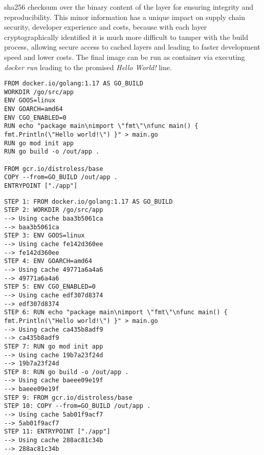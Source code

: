 \documentclass[titlepage]{report}
\begin{document}
\gls{sha256} checksum over the binary content of the layer for ensuring integrity and reproducibility. This minor information
has a unique impact on supply chain security, developer experience and costs, because with each layer cryptographically
identified it is much more difficult to tamper with the build process, allowing secure access to cached layers
and leading to faster development speed and lower costs. The final image can be run as container via executing
\emph{docker run} leading to the promised \emph{Hello World!} line. 
\begin{minipage}{\linewidth}
\begin{lstlisting}[caption={A multi stage Dockerfile with different layers},label={lst:dockerfile}]
FROM docker.io/golang:1.17 AS GO_BUILD
WORKDIR /go/src/app
ENV GOOS=linux
ENV GOARCH=amd64
ENV CGO_ENABLED=0
RUN echo "package main\nimport \"fmt\"\nfunc main() { fmt.Println(\"Hello world!\") }" > main.go
RUN go mod init app
RUN go build -o /out/app .

FROM gcr.io/distroless/base
COPY --from=GO_BUILD /out/app .
ENTRYPOINT ["./app"]
\end{lstlisting}
\end{minipage}
\begin{minipage}{\linewidth}
\begin{lstlisting}[caption={Output of a docker build run with shortened SHA256 checksums},label={lst:dockerbuild}]
STEP 1: FROM docker.io/golang:1.17 AS GO_BUILD
STEP 2: WORKDIR /go/src/app
--> Using cache baa3b5061ca
--> baa3b5061ca
STEP 3: ENV GOOS=linux
--> Using cache fe142d360ee
--> fe142d360ee
STEP 4: ENV GOARCH=amd64
--> Using cache 49771a6a4a6
--> 49771a6a4a6
STEP 5: ENV CGO_ENABLED=0
--> Using cache edf307d8374
--> edf307d8374
STEP 6: RUN echo "package main\nimport \"fmt\"\nfunc main() { fmt.Println(\"Hello world!\") }" > main.go
--> Using cache ca435b8adf9
--> ca435b8adf9
STEP 7: RUN go mod init app
--> Using cache 19b7a23f24d
--> 19b7a23f24d
STEP 8: RUN go build -o /out/app .
--> Using cache baeee09e19f
--> baeee09e19f
STEP 9: FROM gcr.io/distroless/base
STEP 10: COPY --from=GO_BUILD /out/app .
--> Using cache 5ab01f9acf7
--> 5ab01f9acf7
STEP 11: ENTRYPOINT ["./app"]
--> Using cache 288ac81c34b
--> 288ac81c34b
\end{lstlisting}
\end{minipage}
\end{document}
